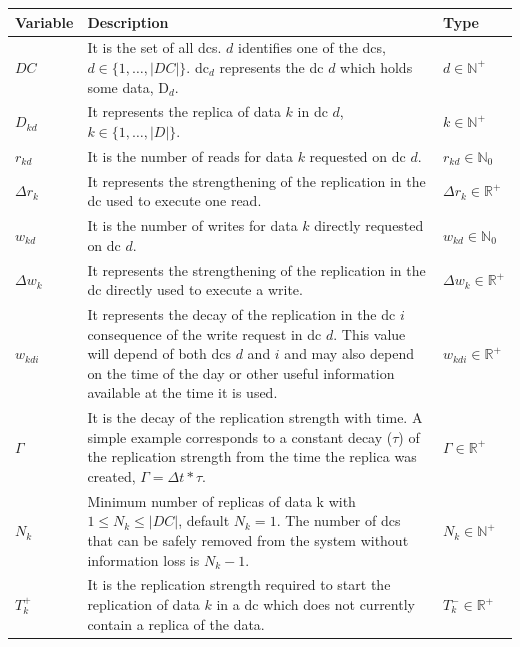 \documentclass[english]{article}
\begin{document}
\begin{table}[ht!]
	\begin{tabular}{ |l|p{7.8cm}|l|}
		\hline
		{\bf Variable}    & {\bf Description} & {\bf Type} \\
		\hline
		\hline
		$DC$                & It is the set of all \glspl{dc}. $d$ identifies one of the \glspl{dc}, $d \in \{1,\dots, |DC|\}$. \gls{dc}$_{d}$ represents the \gls{dc} $d$ which holds some data, D$_{d}$. &  $d \in \mathbb{N}^{+}$ \\
		\hline
		$D_{kd}$           & It represents the replica of data $k$ in \gls{dc} $d$, $k \in \{1,\dots, |D|\}$. & $k \in \mathbb{N}^{+}$ \\
		\hline
		$r_{kd}$            & It is the number of reads for data $k$ requested on \gls{dc} $d$. & $r_{kd} \in \mathbb{N}_{0}$ \\
		\hline
		$\Delta r_{k}$   & It represents the strengthening of the replication in the \gls{dc} used to execute one read. & $\Delta r_{k} \in \mathbb{R}^{+}$ \\
		\hline
		$w_{kd}$           & It is the number of writes for data $k$ directly requested on \gls{dc} $d$. & $w_{kd}\in \mathbb{N}_{0}$ \\
		\hline
		$\Delta w_{k}$  & It represents the strengthening of the replication in the \gls{dc} directly used to execute a write. & $\Delta w_{k} \in \mathbb{R}^{+}$ \\
		\hline
		$w_{kdi}$          & It represents the decay of the replication in the \gls{dc} $i$ consequence of the write request in \gls{dc} $d$. This value will depend of both \glspl{dc} $d$ and $i$ and may also depend on the time of the day or other useful information available at the time it is used. & $w_{kdi} \in \mathbb{R}^{+}$ \\
		\hline
		$\Gamma$      & It is the decay of the replication strength with time. A simple example corresponds to a constant decay ($\tau$) of the replication strength from the time the replica was created, $\Gamma = \Delta t * \tau$. & $\Gamma \in \mathbb{R}^{+}$ \\
		\hline
		$N_{k}$           & Minimum number of replicas of data k with $1 \le N_{k} \le |DC|$, default $N_{k} = 1$. The number of \glspl{dc} that can be safely removed from the system without information loss is $N_{k} -1$. & $N_{k} \in \mathbb{N}^{+}$ \\
		\hline
		$T^{+}_{k}$       & It is the replication strength required to start the replication of data $k$ in a \gls{dc} which does not currently contain a replica of the data. & $T^{-}_{k} \in \mathbb{R}^{+}$ \\

\end{tabular}
\end{table}
\end{document}
